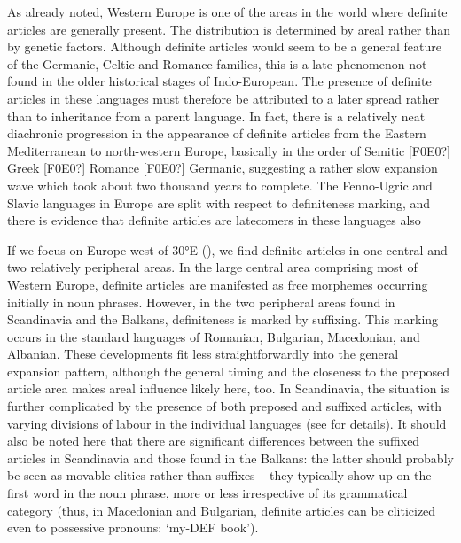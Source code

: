 As already noted, Western Europe is one of the areas in the world where definite articles are generally present. The distribution is determined by areal rather than by genetic factors. Although definite articles would seem to be a general feature of the Germanic, Celtic and Romance families, this is a late phenomenon not found in the older historical stages of Indo-European. The presence of definite articles in these languages must therefore be attributed to a later spread rather than to inheritance from a parent language. In fact, there is a relatively neat diachronic progression in the appearance of definite articles from the Eastern Mediterranean to north-western Europe, basically in the order of Semitic [F0E0?] Greek [F0E0?] Romance [F0E0?] Germanic, suggesting a rather slow expansion wave which took about two thousand years to complete. The Fenno-Ugric and Slavic languages in Europe are split with respect to definiteness marking, and there is evidence that definite articles are latecomers in these languages also

If we focus on Europe west of 30°E (), we find definite articles in one central and two relatively peripheral areas. In the large central area comprising most of Western Europe, definite articles are manifested as free morphemes occurring initially in noun phrases. However, in the two peripheral areas found in Scandinavia and the Balkans, definiteness is marked by suffixing.  This marking occurs in the standard languages of Romanian, Bulgarian, Macedonian, and Albanian. These developments fit less straightforwardly into the general expansion pattern, although the general timing and the closeness to the preposed article area makes areal influence likely here, too. In Scandinavia, the situation is further complicated by the presence of both preposed and suffixed articles, with varying divisions of labour in the individual languages (see  for details). It should also be noted here that there are significant differences between the suffixed articles in Scandinavia and those found in the Balkans: the latter should probably be seen as movable clitics rather than suffixes – they typically show up on the first word in the noun phrase, more or less irrespective of its grammatical category (thus, in Macedonian and Bulgarian, definite articles can be cliticized even to possessive pronouns:  ‘my-DEF book’). 

